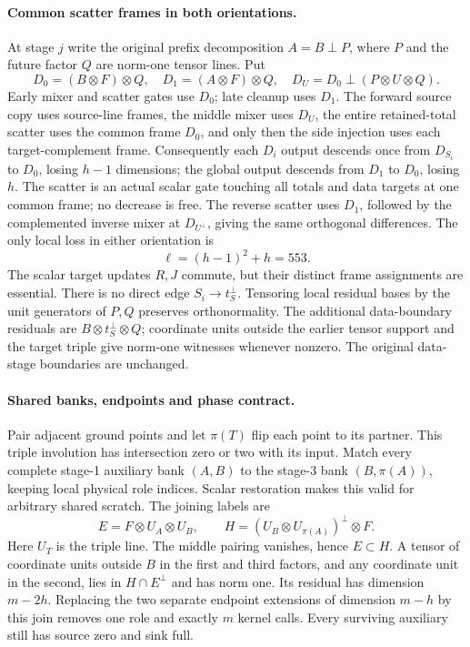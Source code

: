 \paragraph{Common scatter frames in both orientations.}
At stage $j$ write the original prefix decomposition $A=B\perp P$, where
$P$ and the future factor $Q$ are norm-one tensor lines. Put
\[
 D_0=(B\otimes F)\otimes Q,\quad D_1=(A\otimes F)\otimes Q,\quad
 D_U=D_0\perp(P\otimes U\otimes Q).
\]
Early mixer and scatter gates use $D_0$; late cleanup uses $D_1$.
The forward source copy uses source-line frames, the middle mixer uses
$D_U$, the entire retained-total scatter uses the common frame $D_0$, and
only then the side injection uses each target-complement frame.
Consequently each $D_i$ output descends once from $D_{S_i}$ to $D_0$,
losing $h-1$ dimensions; the global output descends from $D_1$ to $D_0$,
losing $h$. The scatter is an actual scalar gate touching all totals and
data targets at one common frame; no decrease is free.
The reverse scatter uses $D_1$, followed by the complemented inverse mixer
at $D_{U^\perp}$, giving the same orthogonal differences. The only local
loss in either orientation is
\[
 \ell=(h-1)^2+h=553.
\]
The scalar target updates $R,J$ commute, but their distinct frame assignments
are essential. There is no direct edge $S_i\to t_S^\perp$.
Tensoring local residual bases by the unit generators of $P,Q$ preserves
orthonormality. The additional data-boundary residuals are
$B\otimes t_S^\perp\otimes Q$; coordinate units outside the earlier tensor
support and the target triple give norm-one witnesses whenever nonzero.
The original data-stage boundaries are unchanged.

\paragraph{Shared banks, endpoints and phase contract.}
Pair adjacent ground points and let $\pi(T)$ flip each point to its partner.
This triple involution has intersection zero or two with its input.
Match every complete stage-1 auxiliary bank $(A,B)$ to the stage-3 bank
$(B,\pi(A))$, keeping local physical role indices. Scalar restoration makes
this valid for arbitrary shared scratch. The joining labels are
\[
 E=F\otimes U_A\otimes U_B,\qquad
 H=(U_B\otimes U_{\pi(A)})^\perp\otimes F.
\]
Here $U_T$ is the triple line. The middle pairing vanishes, hence $E\subset H$.
A tensor of coordinate units outside $B$ in the first and third factors,
and any coordinate unit in the second, lies in $H\cap E^\perp$ and has norm
one. Its residual has dimension $m-2h$. Replacing the two separate endpoint
extensions of dimension $m-h$ by this join removes one role and exactly $m$
kernel calls. Every surviving auxiliary still has source zero and sink full.


